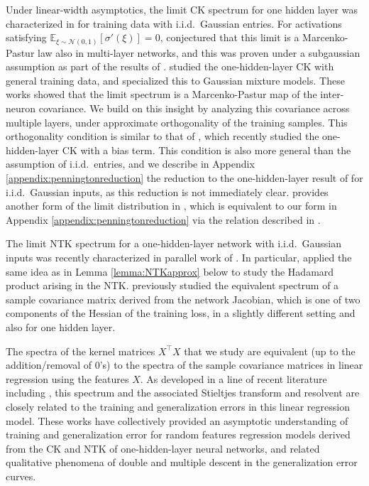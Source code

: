 \documentclass{article}
\theoremstyle{definition}
\newcommand{\N}{\mathcal{N}}
\newcommand{\E}{\mathbb{E}}
\newcommand{\1}{\mathbf{1}}
\begin{document}
Under linear-width asymptotics, the limit CK spectrum for
one hidden layer was characterized in
\cite{pennington2017nonlinear} for training data with i.i.d.\ Gaussian entries.
For activations satisfying $\E_{\xi \sim \N(0,1)}[\sigma'(\xi)]=0$,
\cite{pennington2017nonlinear} conjectured that this limit is a
Marcenko-Pastur law also in multi-layer networks, and this was proven under a
subgaussian assumption as part of the results of \cite{benigni2019eigenvalue}.
\cite{louart2018random} studied the one-hidden-layer CK
with general training data, and
\cite{liao2018spectrum} specialized this
to Gaussian mixture models. These works \cite{louart2018random,liao2018spectrum}
showed that the limit spectrum is a Marcenko-Pastur map of the inter-neuron
covariance.
We build on this insight by analyzing this covariance across multiple layers,
under approximate orthogonality of the training samples. 
This orthogonality condition is similar to that of \cite{adlam2019random},
which recently studied the one-hidden-layer CK with a bias term.
This condition is also more general than the assumption of i.i.d.\ entries,
and we describe in Appendix \ref{appendix:penningtonreduction}
the reduction to the one-hidden-layer result
of \cite{pennington2017nonlinear} for i.i.d.\ Gaussian inputs,
as this reduction is not immediately clear. \cite{peche2019note} provides
another form of the limit distribution in
\cite{pennington2017nonlinear}, which is equivalent to our form in
Appendix \ref{appendix:penningtonreduction} via the relation described in
\cite{benaych2010surprising}.

The limit NTK spectrum for a one-hidden-layer network with i.i.d.\ Gaussian
inputs was recently characterized in parallel work of
\cite{adlam2020neural}. In particular, \cite{adlam2020neural} applied the same
idea as in Lemma \ref{lemma:NTKapprox} below to study the Hadamard product
arising in the NTK. \cite{pennington2017geometry,pennington2018spectrum}
previously studied the equivalent spectrum of 
a sample covariance matrix derived from the network Jacobian, which is one of
two components of the Hessian of the training loss, in a slightly different
setting and also for one hidden layer.

The spectra of the kernel matrices $X^\top X$ that we study are equivalent
(up to the addition/removal of 0's) to the spectra of the sample covariance
matrices in linear regression using the features $X$. As developed in a line
of recent literature including \cite{dicker2016ridge,pennington2017nonlinear,dobriban2018high,louart2018random,liao2018dynamics,hastie2019surprises,mei2019generalization,adlam2020neural,dascoli2020double}, this spectrum and the associated Stieltjes transform and resolvent are
closely related to the training and generalization errors in this linear
regression model. These works have collectively
provided an asymptotic understanding of training and generalization error for
random features regression models derived from the CK and NTK of
one-hidden-layer neural networks, and related 
qualitative phenomena of double and multiple descent in the generalization
error curves. 
\end{document}
